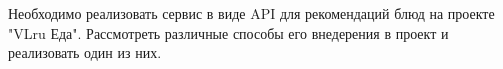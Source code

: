 Необходимо реализовать сервис в виде API для рекомендаций блюд на проекте "VLru Еда".
Рассмотреть различные способы его внедерения в проект и реализовать один из них.
